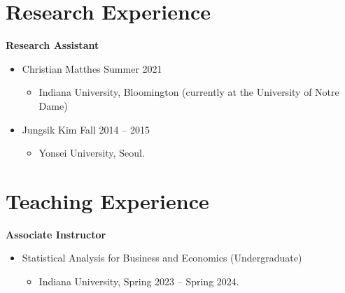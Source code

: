 \documentclass[11pt,a4paper]{article}
\begin{document}
\section*{Research Experience}
\textbf{Research Assistant} 
\begin{itemize}[leftmargin=*]
    \item Christian Matthes \hfill Summer 2021
    \begin{itemize}
        \item Indiana University, Bloomington (currently at the University of Notre Dame)    
    \end{itemize}
    \item Jungsik Kim \hfill Fall 2014 -- 2015
    \begin{itemize}
        \item Yonsei University, Seoul.       
    \end{itemize}    
\end{itemize}

\vspace{5mm}
\section*{Teaching Experience}
\textbf{Associate Instructor}
\begin{itemize}[leftmargin=*]   
    \item Statistical Analysis for Business and Economics (Undergraduate)
    \begin{itemize}[leftmargin=*]
        \item Indiana University, Spring 2023 -- Spring 2024.
    \end{itemize}
\end{itemize}
\vspace{5mm}
\end{document}
